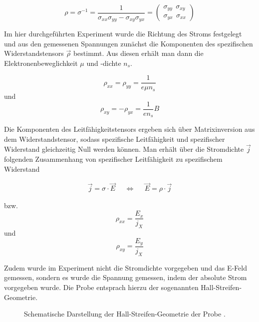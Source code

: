 \begin{equation}
\rho=\sigma^{-1}=\frac{1}{\sigma_{xx}\sigma_{yy} - \sigma_{xy}\sigma_{yx}}=\begin{pmatrix}
\sigma_{yy} ~~ \sigma_{xy} \\ \sigma_{yx} ~~ \sigma_{xx}
\end{pmatrix}
\label{eq:widerstandstensor_matrixinversion}
\end{equation}

Im hier durchgeführten Experiment wurde die Richtung des Stroms festgelegt und aus den gemessenen Spannungen zunächst die Komponenten des spezifischen Widerstandstensors $\vec{\rho}$ bestimmt. 
Aus diesen erhält man dann die Elektronenbeweglichkeit $\mu$ und -dichte $n_s$.

\begin{equation}
\rho_{xx}=\rho_{yy}=\frac{1}{e\mu n_s}
\label{eq:widerst_tensor_xx_yy}
\end{equation}
und
\begin{equation}
\rho_{xy}=-\rho_{yx}=\frac{1}{e n_s}B
\label{eq:widerst_tensor_xy_yx}
\end{equation}

Die Komponenten des Leitfähigkeitstensors ergeben sich über Matrixinversion aus dem Widerstandstensor, sodass spezifische Leitfähigkeit und spezifischer Widerstand gleichzeitig Null werden können. Man erhält über die Stromdichte $\vec{j}$ folgenden Zusammenhang von spezifischer Leitfähigkeit zu spezifischem Widerstand

\begin{align}
	\vec{j} = \sigma \cdot \vec{E} & & \Leftrightarrow & & \vec{E} = \rho \cdot \vec{j}
	\label{eq:e2rho}
\end{align}

bzw. 
\begin{equation}
\rho_{xx}=\frac{E_x}{j_X}
\label{eq:rho_xx_def}
\end{equation}
und 
\begin{equation}
\rho_{xy}=\frac{E_y}{j_X}
\label{eq:rho_xy_def}
\end{equation}

Zudem wurde im Experiment nicht die Stromdichte vorgegeben und das E-Feld gemessen, sondern es wurde die Spannung gemessen, indem der absolute Strom vorgegeben wurde. Die Probe entsprach hierzu der sogenannten Hall-Streifen-Geometrie. 

\begin{figure}
\centering
{}
\caption[Hallstreifengeometrie]{Schematische Darstellung der Hall-Streifen-Geometrie der Probe \cite{anleitung}.}
\label{fig:Hallstreifen_Geometrie_Anleitungsheft}
\end{figure}


